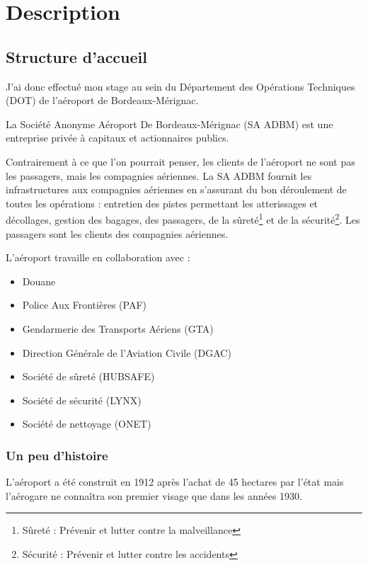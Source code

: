 \chapter{Description}

\section{Structure d'accueil}

J’ai donc effectué mon stage au sein du Département des Opérations Techniques (DOT) de l’aéroport de Bordeaux-Mérignac.

La Société Anonyme Aéroport De Bordeaux-Mérignac (SA ADBM) est une entreprise privée à capitaux et actionnaires publics.\newline

Contrairement à ce que l’on pourrait penser, les clients de l’aéroport ne sont pas les passagers, mais les compagnies aériennes. La SA ADBM fournit les infrastructures aux compagnies aériennes en s’assurant du bon déroulement de toutes les opérations : entretien des pistes permettant les atterissages et décollages, gestion des bagages, des passagers, de la sûreté\footnote{Sûreté : Prévenir et lutter contre la malveillance} et de la sécurité\footnote{Sécurité : Prévenir et lutter contre les accidents}. Les passagers sont les clients des compagnies aériennes.\newline

L’aéroport travaille en collaboration avec :


\begin{itemize}
  \item Douane
  \item Police Aux Frontières (PAF)
  \item Gendarmerie des Transports Aériens (GTA)
  \item Direction Générale de l'Aviation Civile (DGAC)
  \item Société de sûreté (HUBSAFE)
  \item Société de sécurité (LYNX)
  \item Société de nettoyage (ONET)\newline
\end{itemize}


\subsection{Un peu d'histoire}

L'aéroport a été construit en 1912 après l'achat de 45 hectares par l'état mais l'aérogare ne connaîtra son premier visage que dans les années 1930.

